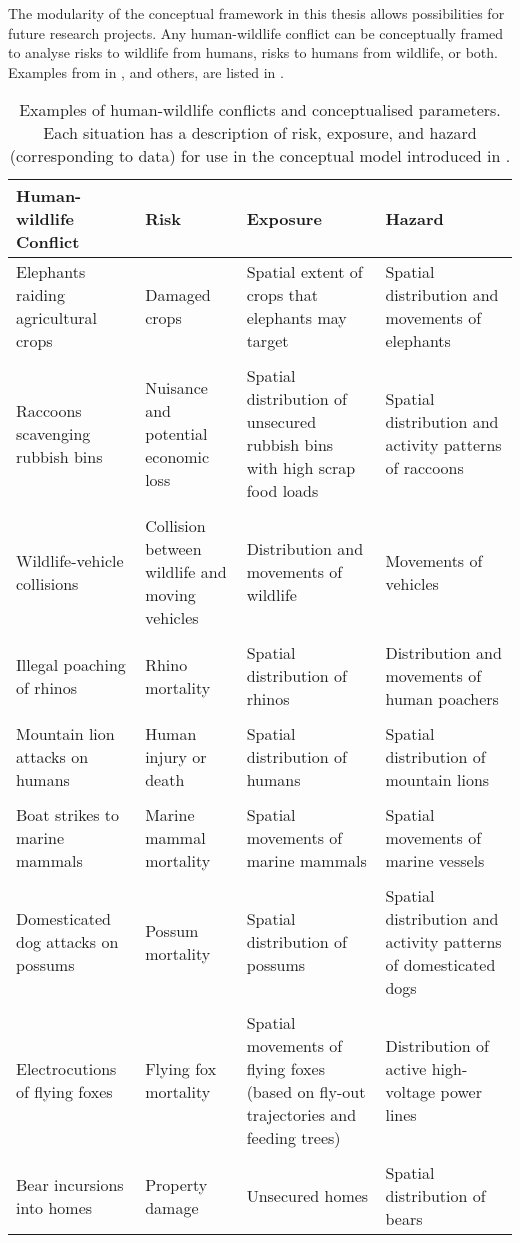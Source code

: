 The modularity of the conceptual framework in this thesis allows possibilities for future research projects. Any human-wildlife conflict can be conceptually framed to analyse risks to wildlife from humans, risks to humans from wildlife, or both. Examples from  in , and others, are listed in .

\begin{table}[h]
\caption[Examples of human-wildlife conflicts and conceptualised parameters]{Examples of human-wildlife conflicts and conceptualised parameters. Each situation has a description of risk, exposure, and hazard (corresponding to data) for use in the conceptual model introduced in .}
\centering
\begin{tabularx}{0.9\textwidth}{YYYY} \toprule
Human-wildlife Conflict					&Risk			&Exposure		&Hazard \\ \midrule
Elephants raiding agricultural crops	&Damaged crops	&Spatial extent of crops that elephants may target	&Spatial distribution and movements of elephants \\
&&& \\
Raccoons scavenging rubbish bins		&Nuisance and potential economic loss	&Spatial distribution of unsecured rubbish bins with high scrap food loads	&Spatial distribution and activity patterns of raccoons \\
&&& \\
Wildlife-vehicle collisions				&Collision between wildlife and moving vehicles	&Distribution and movements of wildlife	&Movements of vehicles \\
&&& \\
Illegal poaching of rhinos				&Rhino mortality	&Spatial distribution of rhinos	&Distribution and movements of human poachers \\
&&& \\
Mountain lion attacks on humans			&Human injury or death	&Spatial distribution of humans	&Spatial distribution of mountain lions \\
&&& \\
Boat strikes to marine mammals			&Marine mammal mortality	&Spatial movements of marine mammals	&Spatial movements of marine vessels \\
&&& \\
Domesticated dog attacks on possums 	&Possum mortality	&Spatial distribution of possums	&Spatial distribution and activity patterns of domesticated dogs \\
&&& \\
Electrocutions of flying foxes			&Flying fox mortality	&Spatial movements of flying foxes (based on fly-out trajectories and feeding trees)	&Distribution of active high-voltage power lines \\
&&& \\
Bear incursions into homes				&Property damage	&Unsecured homes	&Spatial distribution of bears \\
\bottomrule
\end{tabularx}
\label{hmi_risk}
\end{table}


